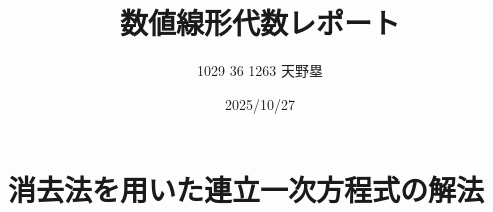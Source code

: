 \documentclass[a4j]{jarticle}
\title{数値線形代数レポート}
\author{1029 36 1263 天野塁}
\date{2025/10/27}
\begin{document}
\maketitle

\section{消去法を用いた連立一次方程式の解法}
\label{sec:q1}
\end{document}
